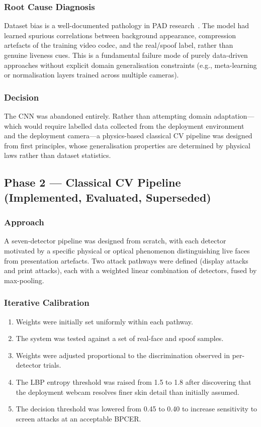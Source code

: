 \documentclass[11pt,a4paper]{article}
\begin{document}
\subsubsection{Root Cause Diagnosis}
Dataset bias is a well-documented pathology in PAD research~\cite{boulkenafet2016color}.
The model had learned spurious correlations between background appearance, compression
artefacts of the training video codec, and the real/spoof label, rather than
genuine liveness cues.
This is a fundamental failure mode of purely data-driven approaches without explicit
domain generalisation constraints (e.g., meta-learning or normalisation layers
trained across multiple cameras).

\subsubsection{Decision}
The CNN was abandoned entirely.
Rather than attempting domain adaptation---which would require labelled data collected
from the deployment environment and the deployment camera---a physics-based classical
CV pipeline was designed from first principles, whose generalisation properties are
determined by physical laws rather than dataset statistics.

\subsection{Phase 2 --- Classical CV Pipeline (Implemented, Evaluated, Superseded)}

\subsubsection{Approach}
A seven-detector pipeline was designed from scratch, with each detector motivated
by a specific physical or optical phenomenon distinguishing live faces from
presentation artefacts.
Two attack pathways were defined (display attacks and print attacks), each with
a weighted linear combination of detectors, fused by max-pooling.

\subsubsection{Iterative Calibration}
\begin{enumerate}[label=\arabic*.]
  \item Weights were initially set uniformly within each pathway.
  \item The system was tested against a set of real-face and spoof samples.
  \item Weights were adjusted proportional to the discrimination observed in
        per-detector trials.
  \item The LBP entropy threshold was raised from 1.5 to 1.8 after discovering
        that the deployment webcam resolves finer skin detail than initially assumed.
  \item The decision threshold was lowered from 0.45 to 0.40 to increase
        sensitivity to screen attacks at an acceptable BPCER.
\end{enumerate}
\end{document}

